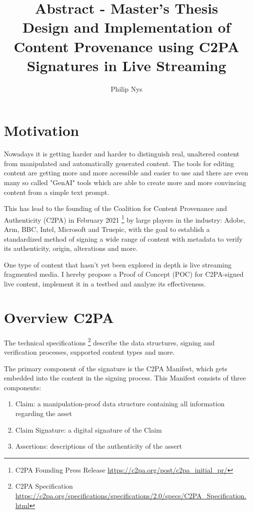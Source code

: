 \documentclass[a4paper]{article}
\author{Philip Nys}
\title{Abstract - Master's Thesis\\Design and Implementation of Content Provenance using C2PA Signatures in Live Streaming}
\begin{document}
\maketitle


\section{Motivation}

Nowadays it is getting harder and harder to distinguish real, unaltered content from manipulated and automatically generated content. The tools for editing content are getting more and more accessible and easier to use and there are even many so called "GenAI" tools which are able to create more and more convincing content from a simple text prompt.

This has lead to the founding of the Coalition for Content Provenance and Authenticity (C2PA) in February 2021 \footnote{C2PA Founding Press Release \url{https://c2pa.org/post/c2pa_initial_pr/}} by large players in the industry: Adobe, Arm, BBC, Intel, Microsoft and Truepic, with the goal to establish a standardized method of signing a wide range of content with metadata to verify its authenticity, origin, alterations and more.

One type of content that hasn't yet been explored in depth is live streaming fragmented media. I hereby propose a Proof of Concept (POC) for C2PA-signed live content, implement it in a testbed and analyze its effectiveness.

\section{Overview C2PA}

The technical specifications \footnote{C2PA Specification \url{https://c2pa.org/specifications/specifications/2.0/specs/C2PA_Specification.html}} describe the data structures, signing and verification processes, supported content types and more.

The primary component of the signature is the C2PA Manifest, which gets embedded into the content in the signing process. This Manifest consists of three components:

\begin{enumerate}
    \item Claim: a manipulation-proof data structure containing all information regarding the asset
    \item Claim Signature: a digital signature of the Claim
    \item Assertions: descriptions of the authenticity of the assert 
\end{enumerate}
\end{document}
